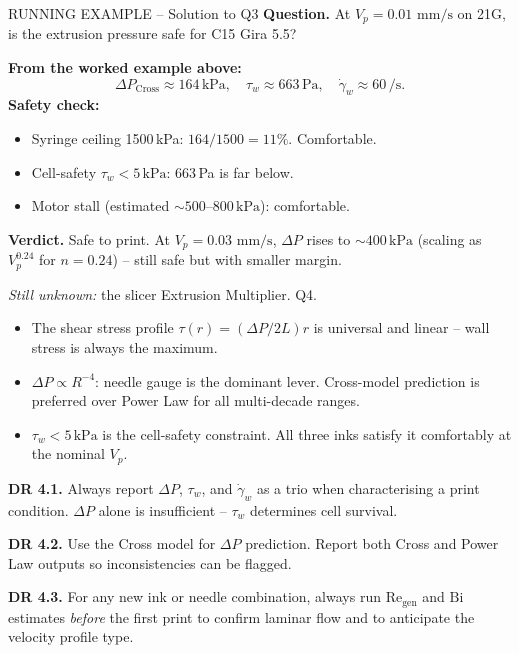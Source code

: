 \documentclass[11pt,a4paper]{article}
\newcommand{\gd}{\dot{\gamma}}
\newcommand{\mms}{\,\mathrm{mm/s}}
\newcommand{\Bi}{\mathrm{Bi}}
\newcommand{\Rey}{\mathrm{Re}}
\begin{document}
\begin{runningbox}{RUNNING EXAMPLE -- Solution to Q3}
\textbf{Question.} At $V_p=0.01\,\mms$ on 21G, is the extrusion
pressure safe for C15 Gira 5.5?

\medskip\textbf{From the worked example above:}
\[
\Delta P_\mathrm{Cross}\approx 164\,\si{\kPa}, \quad
\tau_w\approx 663\,\si{\Pa}, \quad
\gd_w\approx 60\,\si{\per\s}.
\]
\textbf{Safety check:}
\begin{itemize}[leftmargin=1.4em,itemsep=1pt]
\item Syringe ceiling 1500\,\si{\kPa}: $164/1500=11\%$. Comfortable.
\item Cell-safety $\tau_w<5\,\si{\kPa}$: 663\,\si{\Pa} is far below.
\item Motor stall (estimated $\sim 500$--$800\,\si{\kPa}$): comfortable.
\end{itemize}
\textbf{Verdict.} Safe to print. At $V_p=0.03\,\mms$, $\Delta P$
rises to $\sim 400\,\si{\kPa}$ (scaling as $V_p^{0.24}$ for
$n=0.24$) -- still safe but with smaller margin.

\medskip\emph{Still unknown:} the slicer Extrusion Multiplier. Q4.
\end{runningbox}

\begin{takeawaybox}
\begin{itemize}[leftmargin=1.4em,itemsep=2pt]
\item The shear stress profile $\tau(r)=(\Delta P/2L)r$ is universal and
  linear -- wall stress is always the maximum.
\item $\Delta P\propto R^{-4}$: needle gauge is the dominant lever.
  Cross-model prediction is preferred over Power Law for all
  multi-decade ranges.
\item $\tau_w<5\,\si{\kPa}$ is the cell-safety constraint. All three
  inks satisfy it comfortably at the nominal $V_p$.
\end{itemize}
\end{takeawaybox}

\begin{designrulebox}
\textbf{DR 4.1.} Always report $\Delta P$, $\tau_w$, and $\gd_w$ as a
trio when characterising a print condition. $\Delta P$ alone is
insufficient -- $\tau_w$ determines cell survival.

\textbf{DR 4.2.} Use the Cross model for $\Delta P$ prediction. Report
both Cross and Power Law outputs so inconsistencies can be flagged.

\textbf{DR 4.3.} For any new ink or needle combination, always run
$\Rey_\mathrm{gen}$ and $\Bi$ estimates \emph{before} the first print
to confirm laminar flow and to anticipate the velocity profile type.
\end{designrulebox}
\end{document}
